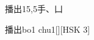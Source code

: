 \begin{entry}{播出}{15,5}{⼿、⼐}
  \begin{phonetics}{播出}{bo1 chu1}[][HSK 3]
  \end{phonetics}
\end{entry}
